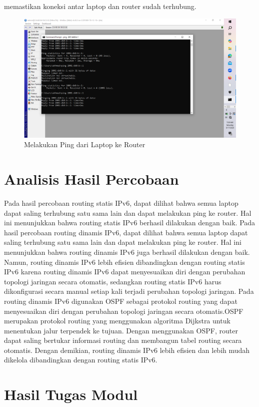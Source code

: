 \begin{enumerate}
    memastikan koneksi antar laptop dan router sudah terhubung.
    \begin{figure}[H]
        \centering
        \includegraphics[width=0.5\linewidth]{ping.png}
        \caption{Melakukan Ping dari Laptop ke Router}
        \label{fig:gambar5}
    \end{figure}
    
\end{enumerate}

\section{Analisis Hasil Percobaan}
Pada hasil percobaan routing statis IPv6, dapat dilihat bahwa semua laptop dapat saling terhubung satu sama lain
dan dapat melakukan ping ke router. Hal ini menunjukkan bahwa routing statis IPv6 berhasil dilakukan dengan baik.
Pada hasil percobaan routing dinamis IPv6, dapat dilihat bahwa semua laptop dapat saling terhubung satu sama lain
dan dapat melakukan ping ke router. Hal ini menunjukkan bahwa routing dinamis IPv6 juga berhasil dilakukan dengan baik.
Namun, routing dinamis IPv6 lebih efisien dibandingkan dengan routing statis IPv6 karena routing dinamis
IPv6 dapat menyesuaikan diri dengan perubahan topologi jaringan secara otomatis, sedangkan routing statis IPv6
harus dikonfigurasi secara manual setiap kali terjadi perubahan topologi jaringan. Pada routing dinamis IPv6 digunakan
OSPF sebagai protokol routing yang dapat menyesuaikan diri dengan perubahan topologi jaringan secara otomatis.OSPF
merupakan protokol routing yang menggunakan algoritma Dijkstra untuk menentukan jalur terpendek ke tujuan.
Dengan menggunakan OSPF, router dapat saling bertukar informasi routing dan membangun tabel routing secara otomatis.
Dengan demikian, routing dinamis IPv6 lebih efisien dan lebih mudah dikelola dibandingkan dengan routing statis IPv6.

\section{Hasil Tugas Modul}

